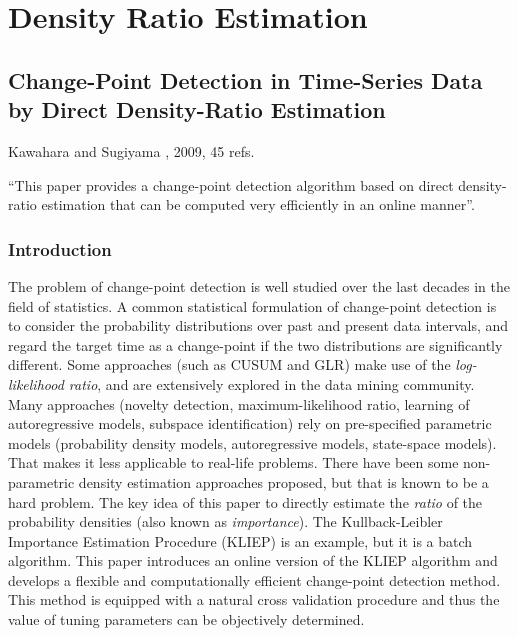 \section{Density Ratio Estimation}

\subsection{Change-Point Detection in Time-Series Data by Direct Density-Ratio Estimation}
Kawahara and Sugiyama \cite{kawahara2009change}, 2009, 45 refs.

``This paper provides a change-point detection algorithm based on direct density-ratio estimation that can be computed very efficiently in an online manner''.

\subsubsection{Introduction}
The problem of change-point detection is well studied over the last decades in the field of statistics.
A common statistical formulation of change-point detection is to consider the probability distributions over past and present data intervals, and regard the target time as a change-point if the two distributions are significantly different.
Some approaches (such as CUSUM and GLR) make use of the \emph{log-likelihood ratio}, and are extensively explored in the data mining community.
Many approaches (novelty detection, maximum-likelihood ratio, learning of autoregressive models, subspace identification) rely on pre-specified parametric models (probability density models, autoregressive models, state-space models).
That makes it less applicable to real-life problems.
There have been some non-parametric density estimation approaches proposed, but that is known to be a hard problem.
The key idea of this paper to directly estimate the \emph{ratio} of the probability densities (also known as \emph{importance}).
The Kullback-Leibler Importance Estimation Procedure (KLIEP) is an example, but it is a batch algorithm.
This paper introduces an online version of the KLIEP algorithm and develops a flexible and computationally efficient change-point detection method.
This method is equipped with a natural cross validation procedure and thus the value of tuning parameters can be objectively determined.

